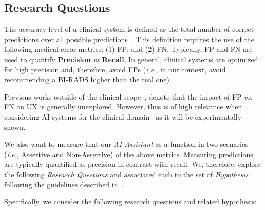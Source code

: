 \subsection{Research Questions}
\label{sec:sec00305}

The accuracy level of a clinical system is defined as the total number of correct predictions over all possible predictions~\cite{seref2019performance}.
This definition requires the use of the following medical error metrics:
(1) FP; and
(2) FN.
Typically, FP and FN are used to quantify {\bf Precision} {\it vs} {\bf Recall}.
In general, clinical systems are optimized for high precision and, therefore, avoid FPs ({\it i.e.}, in our context, avoid recommending a BI-RADS higher than the real one).

Previous works outside of the clinical scope~\cite{Kocielnik:2019:YAI:3290605.3300641, Dove:2017:UDI:3025453.3025739}, denote that the impact of FP {\it vs.} FN on UX is generally unexplored.
However, thus is of high relevance when considering AI systems for the clinical domain~\cite{boughey2016identification, dialani2015role} as it will be experimentally shown.

We also want to measure that our \textit{AI-Assistant} as a function in two scenarios ({\it i.e.}, Assertive and Non-Assertive) of the above metrics.
Measuring predictions are typically quantified as precision in contrast with recall.
We, therefore, explore the following {\it Research Questions} and associated each to the set of {\it Hypothesis} following the guidelines described in~\cite{10.1145/3290605.3300233, Kocielnik:2019:YAI:3290605.3300641}.

\hfill

\noindent
Specifically, we consider the following research questions and related hypothesis:

